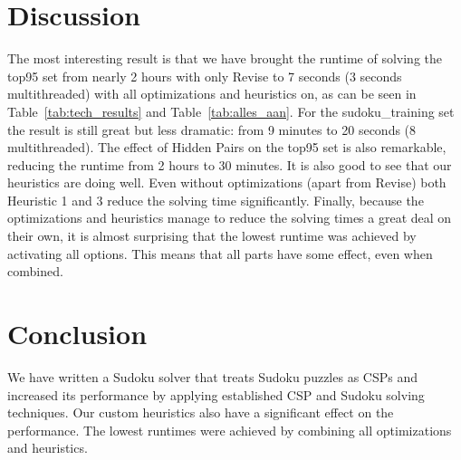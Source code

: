 \documentclass[11pt]{article} %
\begin{document}
\section{Discussion}
\label{sec:disc}
The most interesting result is that we have brought the runtime of solving the top95 set from nearly 2 hours with only Revise to 7 seconds (3 seconds multithreaded) with all optimizations and heuristics on, as can be seen in Table~\ref{tab:tech_results} and Table~\ref{tab:alles_aan}. For the sudoku\_training set the result is still great but less dramatic: from 9 minutes to 20 seconds (8 multithreaded). The effect of Hidden Pairs on the top95 set is also remarkable, reducing the runtime from 2 hours to 30 minutes.
It is also good to see that our heuristics are doing well. Even without optimizations (apart from Revise) both Heuristic 1 and 3 reduce the solving time significantly.
Finally, because the optimizations and heuristics manage to reduce the solving times a great deal on their own, it is almost surprising that the lowest runtime was achieved by activating all options. This means that all parts have some effect, even when combined.

\section{Conclusion}
\label{sec:concl}
We have written a Sudoku solver that treats Sudoku puzzles as CSPs and increased its performance by applying established CSP and Sudoku solving techniques. Our custom heuristics also have a significant effect on the performance. The lowest runtimes were achieved by combining all optimizations and heuristics.





\end{document}
